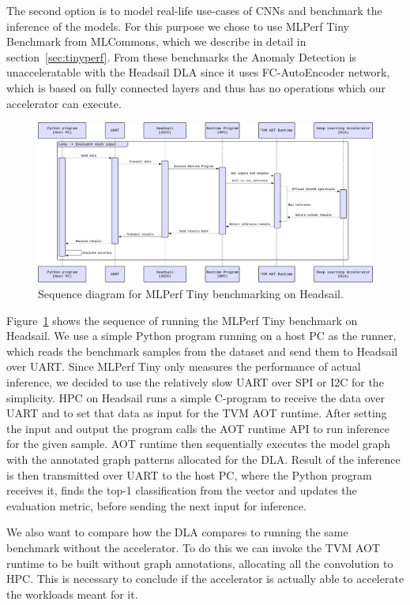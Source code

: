 \documentclass[12pt,a4paper,english
]{tunithesis}
\begin{document}
The second option is to model real-life use-cases of CNNs and benchmark the inference of the models. For this purpose we chose to use MLPerf Tiny Benchmark from MLCommons, which we describe in detail in section~\ref{sec:tinyperf}.
From these benchmarks the Anomaly Detection is unacceleratable with the Headsail DLA since it uses FC-AutoEncoder network, which is based on fully connected layers and thus has no operations which our accelerator can execute.

\begin{figure}[h]
\centering
\includegraphics[width=\linewidth]{img/benchmark-sequence.pdf}
\caption{Sequence diagram for MLPerf Tiny benchmarking on Headsail.}
\label{fig:dla_sequence}
\end{figure}

Figure~\ref{fig:dla_sequence} shows the sequence of running the MLPerf Tiny benchmark on Headsail. We use a simple Python program running on a host PC as the runner, which reads the benchmark samples from the dataset and send them to Headsail over UART. Since MLPerf Tiny only measures the performance of actual inference, we decided to use the relatively slow UART over SPI or I2C for the simplicity. HPC on Headsail runs a simple C-program to receive the data over UART and to set that data as input for the TVM AOT runtime. After setting the input and output the program calls the AOT runtime API to run inference for the given sample. AOT runtime then sequentially executes the model graph with the annotated graph patterns allocated for the DLA. Result of the inference is then transmitted over UART to the host PC, where the Python program receives it, finds the top-1 classification from the vector and updates the evaluation metric, before sending the next input for inference.

We also want to compare how the DLA compares to running the same benchmark without the accelerator. To do this we can invoke the TVM AOT runtime to be built without graph annotations, allocating all the convolution to HPC. This is necessary to conclude if the accelerator is actually able to accelerate the workloads meant for it.
\end{document}
